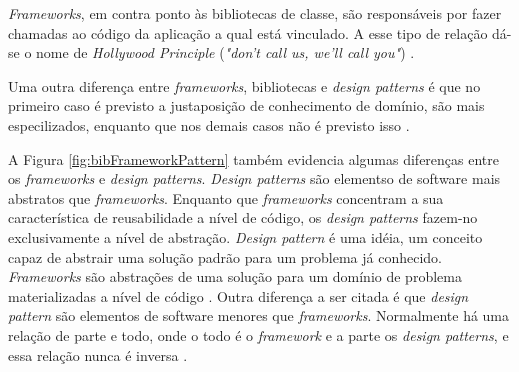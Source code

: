 \par
\indent \textit{Frameworks}, em contra ponto às bibliotecas de classe, são responsáveis por fazer chamadas ao código da aplicação a qual está vinculado. A esse tipo de relação dá-se o nome de \textit{Hollywood Principle} (\textit{"don't call us, we'll call you"}) \cite{sauve2006}.
\par
\indent Uma outra diferença entre \textit{frameworks}, bibliotecas e \textit{design patterns} é que no  primeiro caso é previsto a justaposição de conhecimento de domínio, são mais especilizados, enquanto que nos demais casos não é previsto isso \cite{sauve2006}.
\par
\indent A Figura \ref{fig:bibFrameworkPattern} também evidencia algumas diferenças entre os \textit{frameworks} e \textit{design patterns}. \textit{Design patterns} são elementso de software mais abstratos que \textit{frameworks}. Enquanto que \textit{frameworks} concentram a sua característica de reusabilidade a nível de código, os \textit{design patterns} fazem-no exclusivamente a nível de abstração. \textit{Design pattern} é uma idéia, um conceito capaz de abstrair uma solução padrão para um problema já conhecido. \textit{Frameworks} são abstrações de uma solução para um domínio de problema materializadas a nível de código \cite{sauve2006}. Outra diferença a ser citada é que \textit{design pattern} são elementos de software menores que \textit{frameworks}. Normalmente há uma relação de parte e todo, onde o todo é o \textit{framework} e a parte os \textit{design patterns}, e essa relação nunca é inversa \cite{sauve2006}.

